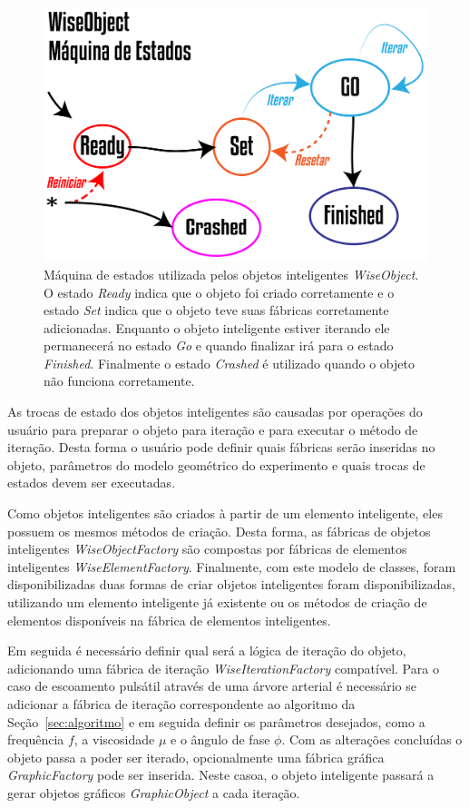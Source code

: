 \begin{figure}[!htbp]
	\centering
	\includegraphics[scale=2]{Figures/WiseObjectStatus@16x.png}
	\caption{Máquina de estados utilizada pelos objetos inteligentes \textit{WiseObject}. O estado \textit{Ready} indica que o objeto foi criado corretamente e o estado \textit{Set} indica que o objeto teve suas fábricas corretamente adicionadas. Enquanto o objeto inteligente estiver iterando ele permanecerá no estado \textit{Go} e quando finalizar irá para o estado \textit{Finished}. Finalmente o estado \textit{Crashed} é utilizado quando o objeto não funciona corretamente.}
	\label{fig7:wiseobjectstatuses}
\end{figure}

As trocas de estado dos objetos inteligentes são causadas por operações do usuário para preparar o objeto para iteração e para executar o método de iteração. Desta forma o usuário pode definir quais fábricas serão inseridas no objeto, parâmetros do modelo geométrico do experimento e quais trocas de estados devem ser executadas.

Como objetos inteligentes são criados à partir de um elemento inteligente, eles possuem os mesmos métodos de criação. Desta forma, as fábricas de objetos inteligentes \textit{WiseObjectFactory} são compostas por fábricas de elementos inteligentes \textit{WiseElementFactory}. Finalmente, com este modelo de classes, foram disponibilizadas duas formas de criar objetos inteligentes foram disponibilizadas, utilizando um elemento inteligente já existente ou os métodos de criação de elementos disponíveis na fábrica de elementos inteligentes.

Em seguida é necessário definir qual será a lógica de iteração do objeto, adicionando uma fábrica de iteração \textit{WiseIterationFactory} compatível. Para o caso de escoamento pulsátil através de uma árvore arterial é necessário se adicionar a fábrica de iteração correspondente ao algoritmo da Seção~\ref{sec:algoritmo} e em seguida definir os parâmetros desejados, como a frequência $f$, a viscosidade $\mu$ e o ângulo de fase $\phi$. Com as alterações concluídas o objeto passa a poder ser iterado, opcionalmente uma fábrica gráfica \textit{GraphicFactory} pode ser inserida. Neste casoa, o objeto inteligente passará a gerar objetos gráficos \textit{GraphicObject} a cada iteração.

